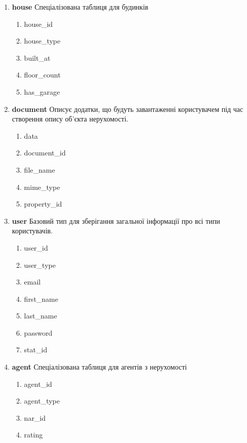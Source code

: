 \begin{enumerate}
    \item \textbf{house}
          Спеціалізована таблиця для будинків
          \begin{enumerate}
              \item house\_id
              \item house\_type
              \item built\_at
              \item floor\_count
              \item has\_garage
          \end{enumerate}

    \item \textbf{document}
          Описує додатки, що будуть завантаженні користувачем під час створення опису об'єкта нерухомості.
          \begin{enumerate}
              \item data
              \item document\_id
              \item file\_name
              \item mime\_type
              \item property\_id
          \end{enumerate}

    \item \textbf{user}
          Базовий тип для зберігання загальної інформації про всі типи користувачів.
          \begin{enumerate}
              \item user\_id
              \item user\_type
              \item email
              \item first\_name
              \item last\_name
              \item password
              \item stat\_id
          \end{enumerate}

    \item \textbf{agent}
          Спеціалізована таблиця для агентів з нерухомості
          \begin{enumerate}
              \item agent\_id
              \item agent\_type
              \item nar\_id
              \item rating
          \end{enumerate}


\end{enumerate}
